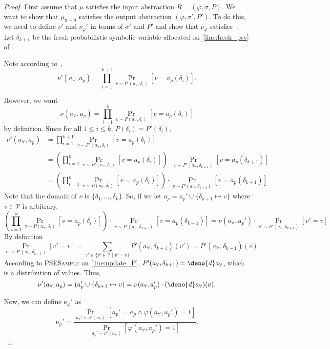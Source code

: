 \documentclass[acmsmall,review,anonymous]{acmart}\settopmatter{printfolios=true,printccs=false,printacmref=false}
\begin{document}
\soundnessSampling*
\begin{proof}
  First assume that $\mu$ satisfies the input abstraction $R = (\varphi,\sigma,P)$. We want to show that $\mu_{\mathtt{x} \sim d}$ satisfies the output abstraction $(\varphi,\sigma',P')$. To do this, we need to define $\nu'$ and $\nu_{\varphi}'$ in terms of $\sigma'$ and $P'$ and show that $\nu_{\varphi}$ satisfies~. Let $\delta_{k+1}$ be the fresh probabilistic symbolic variable allocated on~\cref{line:fresh_psv} of~.

  Note according to~,
  \[
    \nu'(a_{\forall},a_p) = \prod_{i=1}^{k+1} \Pr_{v \sim P'(a_{\forall},\delta_i)}[v = a_p(\delta_i)].
  \]
  
  However, we want
  \[
    \nu(a_{\forall},a_p) = \prod_{i=1}^{k} \Pr_{v \sim P(a_{\forall},\delta_i)}[v = a_p(\delta_i)]
  \]
  by definition. Since for all $1 \leq i \leq k$, $P(\delta_i) = P'(\delta_i)$,
  \begin{align*}
    \nu'(a_{\forall},a_p) &= \prod_{i=1}^{k+1} \Pr_{v \sim P'(a_{\forall},\delta_i)}[v = a_p(\delta_i)]\\
                  &= \left( \prod_{i=1}^{k} \Pr_{v \sim P'(a_{\forall},\delta_i)}[v = a_p(\delta_i)] \right) \cdot \Pr_{v \sim P'(a_{\forall},\delta_{k+1})}[v = a_p(\delta_{k+1})] \\
                  &= \left( \prod_{i=1}^{k} \Pr_{v \sim P(a_{\forall},\delta_i)}[v = a_p(\delta_i)] \right) \cdot \Pr_{v \sim P'(a_{\forall},\delta_{k+1})}[v = a_p(\delta_{k+1})] 
  \end{align*}
  Note that the domain of $\nu$ is $\{\delta_1,\ldots,\delta_k\}$. So, if we let $a_p = a_p' \cup \{\delta_{k+1} \mapsto v\}$ where $v \in \mathcal{V}$ is arbitrary,
  \[
    \left( \prod_{i=1}^{k} \Pr_{v \sim P(a_{\forall},\delta_i)}[v = a_p(\delta_i)] \right) \cdot \Pr_{v \sim P'(a_{\forall},\delta_{k+1})}[v = a_p(\delta_{k+1})] = \nu(a_{\forall},a_p') \cdot \Pr_{v' \sim P'(a_{\forall},\delta_{k+1})}[v' = v]
  \]
  By definition
  \[
    \Pr_{v' \sim P'(a_{\forall},\delta_{k+1})}[v' = v] = \sum_{v' \in \{v' \in \mathcal{V} \mid v' = v\}} P'(a_{\forall},\delta_{k+1})(v') = P'(a_{\forall},\delta_{k+1})(v).
  \]
  According to \textsc{PSESample} on \cref{line:update_P}, $P'(a_{\forall},\delta_{k+1}) = \deno{d} a_{\forall}$, which is a distribution of values. Thus,
  \[
    \nu'(a_{\forall},a_p) = (a_p' \cup \{\delta_{k+1} \mapsto v) = \nu(a_{\forall},a_p') \cdot (\deno{d} a_{\forall})(v).
  \]

  Now, we can define $\nu_{\varphi}'$ as
  \[
    \nu_{\varphi}' = \frac{\Pr_{a_p' \sim \nu'(a_{\forall})}[a_p' = a_p \wedge \varphi(a_{\forall},a_p') = 1]}{\Pr_{a_p' \sim \nu'(a_{\forall})}[\varphi(a_{\forall},a_p') = 1]}.
  \]


\end{proof}
\end{document}
